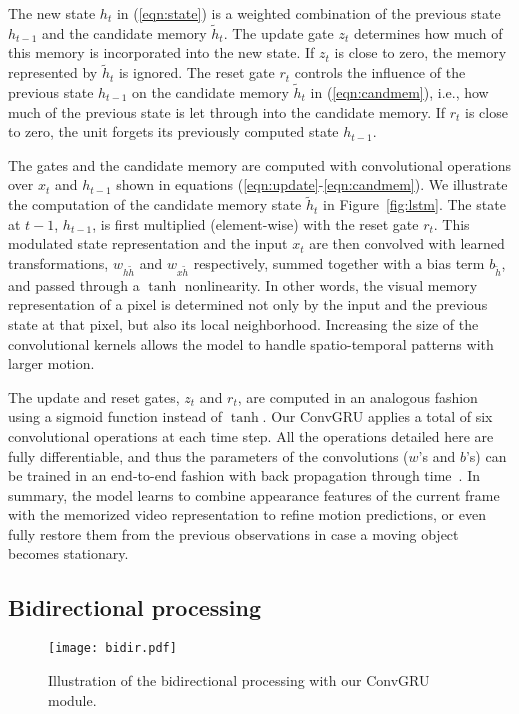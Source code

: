 \documentclass[10pt,twocolumn,letterpaper]{article}
\begin{document}
The new state $h_t$ in (\ref{eqn:state}) is a weighted combination of the
previous state $h_{t-1}$ and the candidate memory $\tilde{h}_t$. The update
gate $z_t$ determines how much of this memory is incorporated into the new
state. If $z_t$ is close to zero, the memory represented by $\tilde{h}_t$ is
ignored. The reset gate $r_t$ controls the influence of the previous state
$h_{t-1}$ on the candidate memory $\tilde{h}_t$ in (\ref{eqn:candmem}), i.e.,
how much of the previous state is let through into the candidate memory. If
$r_t$ is close to zero, the unit forgets its previously computed state
$h_{t-1}$.

The gates and the candidate memory are computed with convolutional operations
over $x_t$ and $h_{t-1}$ shown in equations
(\ref{eqn:update}-\ref{eqn:candmem}). We illustrate the computation of the
candidate memory state $\tilde{h}_t$ in Figure~\ref{fig:lstm}.  The state at
$t-1$, $h_{t-1}$, is first multiplied (element-wise) with the reset gate $r_t$.
This modulated state representation and the input $x_t$ are then convolved with
learned transformations, $w_{h\tilde{h}}$ and $w_{x\tilde{h}}$ respectively,
summed together with a bias term $b_{\tilde{h}}$, and passed through a $\tanh$
nonlinearity. In other words, the visual memory representation of a pixel is
determined not only by the input and the previous state at that pixel, but also
its local neighborhood. Increasing the size of the convolutional kernels allows
the model to handle spatio-temporal patterns with larger motion.

The update and reset gates, $z_t$ and $r_t$, are computed in an analogous
fashion using a sigmoid function instead of $\tanh$. Our ConvGRU applies a
total of six convolutional operations at each time step. All the operations
detailed here are fully differentiable, and thus the parameters of the
convolutions ($w$'s and $b$'s) can be trained in an end-to-end fashion with
back propagation through time~\cite{werbos1990backpropagation}. In summary, the
model learns to combine appearance features of the current frame with the
memorized video representation to refine motion predictions, or even fully
restore them from the previous observations in case a moving object becomes
stationary.

\subsection{Bidirectional processing}
\label{sec:bidirec}
\begin{figure}[t]
\begin{center}
\texttt{[image: bidir.pdf]}
\end{center}
\vspace{-0.3cm}
\caption{Illustration of the bidirectional processing with our ConvGRU module.}
\vspace{-0.3cm}
\label{fig:bidir}
\end{figure}
\end{document}
